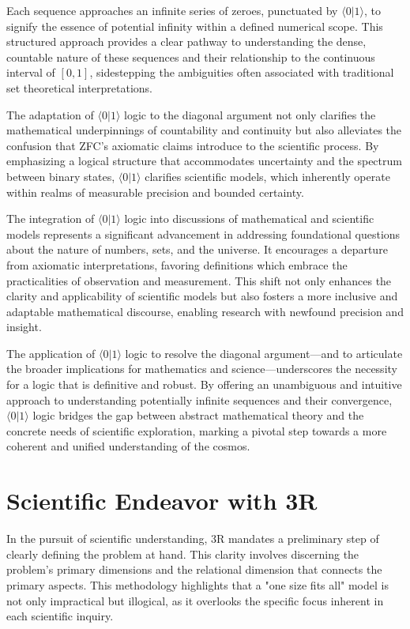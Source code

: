 \documentclass[12pt]{article}
\newcommand{\qbit}{\langle 0 | 1 \rangle}
\begin{document}
Each sequence approaches an infinite series of zeroes, punctuated by \(\qbit\), to signify the essence of potential infinity within a defined numerical scope. This structured approach provides a clear pathway to understanding the dense, countable nature of these sequences and their relationship to the continuous interval of \([0,1]\), sidestepping the ambiguities often associated with traditional set theoretical interpretations.

The adaptation of \(\qbit\) logic to the diagonal argument not only clarifies the mathematical underpinnings of countability and continuity but also alleviates the confusion that ZFC's  axiomatic claims introduce to the scientific process. By emphasizing a logical structure that accommodates uncertainty and the spectrum between binary states, \(\qbit\) clarifies scientific models, which inherently operate within realms of measurable precision and bounded certainty.

The integration of \(\qbit\) logic into discussions of mathematical and scientific models represents a significant advancement in addressing foundational questions about the nature of numbers, sets, and the universe. It encourages a departure from axiomatic interpretations, favoring definitions which embrace the practicalities of observation and measurement. This shift not only enhances the clarity and applicability of scientific models but also fosters a more inclusive and adaptable mathematical discourse, enabling research with newfound precision and insight.

The application of \(\qbit\) logic to resolve the diagonal argument—and to articulate the broader implications for mathematics and science—underscores the necessity for a logic that is definitive and robust. By offering an unambiguous and intuitive approach to understanding potentially infinite sequences and their convergence, \(\qbit\) logic bridges the gap between abstract mathematical theory and the concrete needs of scientific exploration, marking a pivotal step towards a more coherent and unified understanding of the cosmos.

\section*{Scientific Endeavor with 3R}

In the pursuit of scientific understanding, 3R mandates a preliminary step of clearly defining the problem at hand. This clarity involves discerning the problem's primary dimensions and the relational dimension that connects the primary aspects. This methodology highlights that a "one size fits all" model is not only impractical but illogical, as it overlooks the specific focus inherent in each scientific inquiry.
\end{document}
